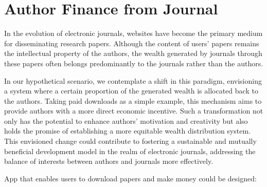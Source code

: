 \documentclass[lettersize,journal]{IEEEtran}
\begin{document}
\section{Author Finance from Journal}


In the evolution of electronic journals, websites have become the primary medium for disseminating research papers. Although the content of users' papers remains the intellectual property of the authors, the wealth generated by journals through these papers often belongs predominantly to the journals rather than the authors.

In our hypothetical scenario, we contemplate a shift in this paradigm, envisioning a system where a certain proportion of the generated wealth is allocated back to the authors. Taking paid downloads as a simple example, this mechanism aims to provide authors with a more direct economic incentive. Such a transformation not only has the potential to enhance authors' motivation and creativity but also holds the promise of establishing a more equitable wealth distribution system. This envisioned change could contribute to fostering a sustainable and mutually beneficial development model in the realm of electronic journals, addressing the balance of interests between authors and journals more effectively.

App that enables users to download papers and make money could be designed:
\end{document}
